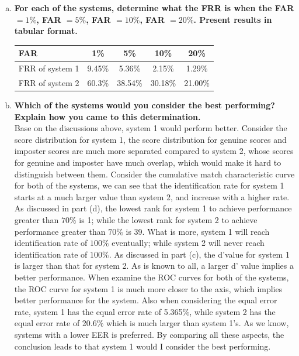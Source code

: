 \documentclass[a4paper]{article}
\begin{document}
\begin{spacing}{2.0}
\begin{enumerate}[(a)]
	\item \textbf{For each of the systems, determine what the FRR is when the FAR $=1\%$, FAR $=5\%$, FAR $=10\%$, FAR $=20\%$. Present results in tabular format.}
	\begin{table}[h]
	\centering
	\begin{tabular}{|l|c|c|c|c|}
	\hline
	FAR & 1\% & 5\% & 10\% & 20\%\\
	\hline
	FRR of system 1 & 9.45\% & 5.36\% & 2.15\% & 1.29\%\\
	\hline
	FRR of system 2 & 60.3\% & 38.54\% & 30.18\% & 21.00\%\\
	\hline
	\end{tabular}
	\end{table}
	
	\item  \textbf{Which of the systems would you consider the best performing? Explain how you came to 	this determination.}\\
	Base on the discussions above, system 1 would perform better. Consider the score distribution for 		system 1, the score distribution for genuine scores and imposter scores are much more separated 		compared to system 2, whose scores for genuine and imposter have much overlap, which would make it hard to distinguish between them. Consider the cumulative match characteristic curve for both of the systems, we can see that the identification rate for system 1 starts at a much larger value than system 2, and increase with a higher rate. As discussed in part (d), the lowest rank for system 1 to achieve performance greater than $70\%$ is 1; while the lowest rank for system 2 to achieve performance greater than $70\%$ is 39. What is more, system 1 will reach identification rate of $100\%$ eventually; while system 2 will never reach identification rate of $100\%$. As discussed in part (c), the d'value for system 1 is larger than that for system 2. As is known to all, a larger d' value implies a better performance. When examine the ROC curves for both of the systems, the ROC curve for system 1 is much more closer to the axis, which implies better performance for the system. Also when considering the equal error rate, system 1 has the equal error rate of 5.365\%, while system 2 has the equal error rate of 20.6\% which is much larger than system 1's. As we know, systems with a lower EER is preferred. By comparing all these aspects,  the conclusion leads to that system 1 would I consider the best performing.
	\end{enumerate}
	

\end{spacing}
\end{document}
